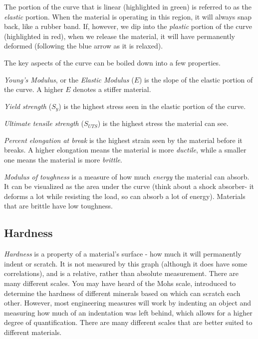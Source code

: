 \documentclass[10pt,letterpaper]{book}
\begin{document}
 The portion of the curve that is linear (highlighted in green) is referred to as the \textit{elastic} portion. When the material is operating in this region, it will always snap back, like a rubber band. If, however, we dip into the \textit{plastic} portion of the curve (highlighted in red), when we release the material, it will have permanently deformed (following the blue arrow as it is relaxed).
 
 The key aspects of the curve can be boiled down into a few properties.
 
 \begin{asparaenum}[a)]
 	\item \textit{Young's Modulus}, or the \textit{Elastic Modulus} ($E$) is the slope of the elastic portion of the curve. A higher $E$ denotes a stiffer material.
 	\item \textit{Yield strength} ($S_{y}$) is the highest stress seen in the elastic portion of the curve.
 	\item \textit{Ultimate tensile strength} ($S_{UTS}$) is the highest stress the material can see.
 	\item \textit{Percent elongation at break} is the highest strain seen by the material before it breaks. A higher elongation means the material is more \textit{ductile}, while a smaller one means the material is more \textit{brittle}.
 	\item \textit{Modulus of toughness} is a measure of how much \textit{energy} the material can absorb. It can be visualized as the area under the curve (think about a shock absorber- it deforms a lot while resisting the load, so can absorb a lot of energy). Materials that are brittle have low toughness.
 \end{asparaenum}
 
\subsection{Hardness}

 \textit{Hardness} is a property of a material's surface - how much it will permanently indent or scratch. It is not measured by this graph (although it does have some correlations), and is a relative, rather than absolute measurement. There are many different scales. You may have heard of the Mohs scale, introduced to determine the hardness of different minerals based on which can scratch each other. However, most engineering measures will work by indenting an object and measuring how much of an indentation was left behind, which allows for a higher degree of quantification. There are many different scales that are better suited to different materials.
 
\end{document}
